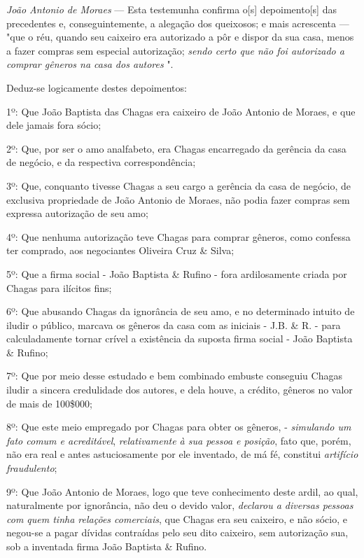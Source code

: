\emph{João Antonio de Moraes} --- Esta testemunha confirma o{[}s{]}
depoimento{[}s{]} das precedentes e, conseguintemente, a alegação dos
queixosos; e mais acrescenta --- "que o réu, quando seu caixeiro era
autorizado a pôr e dispor da sua casa, menos a fazer compras sem
especial autorização; \emph{sendo certo que não foi autorizado a comprar
gêneros na casa dos autores} ".

\asterisc

Deduz-se logicamente destes depoimentos:

1º: Que João Baptista das Chagas era caixeiro de João Antonio de Moraes,
e que dele jamais fora sócio;

2º: Que, por ser o amo analfabeto, era Chagas encarregado da gerência da
casa de negócio, e da respectiva correspondência;

3º: Que, conquanto tivesse Chagas a seu cargo a gerência da casa de
negócio, de exclusiva propriedade de João Antonio de Moraes, não podia
fazer compras sem expressa autorização de seu amo;

4º: Que nenhuma autorização teve Chagas para comprar gêneros, como
confessa ter comprado, aos negociantes Oliveira Cruz \& Silva;

5º: Que a firma social - João Baptista \& Rufino - fora ardilosamente
criada por Chagas para ilícitos fins;

6º: Que abusando Chagas da ignorância de seu amo, e no determinado
intuito de iludir o público, marcava os gêneros da casa com as iniciais
- J.B. \& R. - para calculadamente tornar crível a existência da suposta
firma social - João Baptista \& Rufino;

7º: Que por meio desse estudado e bem combinado embuste conseguiu Chagas
iludir a sincera credulidade dos autores, e dela houve, a crédito,
gêneros no valor de mais de 100\$000;

8º: Que este meio empregado por Chagas para obter os gêneros, -
\emph{simulando um fato comum e acreditável}, \emph{relativamente à sua
pessoa e posição}, fato que, porém, não era real e antes astuciosamente
por ele inventado, de má fé, constitui \emph{artifício fraudulento};

9º: Que João Antonio de Moraes, logo que teve conhecimento deste ardil,
ao qual, naturalmente por ignorância, não deu o devido valor,
\emph{declarou a diversas pessoas com quem tinha relações comerciais},
que Chagas era seu caixeiro, e não sócio, e negou-se a pagar dívidas
contraídas pelo seu dito caixeiro, sem autorização sua, sob a inventada
firma João Baptista \& Rufino.

